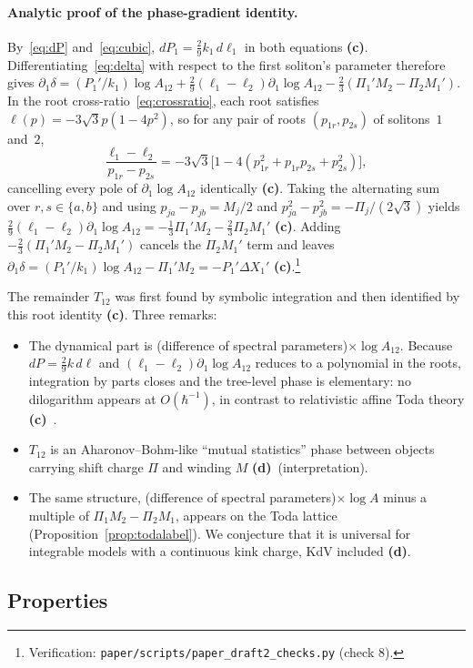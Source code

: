 \documentclass[11pt,a4paper]{article}
\newcommand{\lab}[1]{{\normalfont\sffamily\footnotesize\bfseries(#1)}}
\newcommand{\Lc}{\lab{c}}
\newcommand{\Ld}{\lab{d}}
\newcommand{\scr}[1]{\nolinkurl{#1}}
\newcommand{\chk}[1]{\footnote{\raggedright Verification: #1.}}
\newcommand{\hb}{\hbar}
\theoremstyle{remark}
\begin{document}
\paragraph{Analytic proof of the phase-gradient identity.} By~\eqref{eq:dP} and~\eqref{eq:cubic}, $dP_1=\tfrac29k_1\,d\ell_1$ in both equations \Lc. Differentiating~\eqref{eq:delta} with respect to the first soliton's parameter therefore gives $\partial_1\delta=(P_1'/k_1)\log A_{12}+\tfrac29(\ell_1-\ell_2)\partial_1\log A_{12}-\tfrac23(\Pi_1'M_2-\Pi_2M_1')$. In the root cross-ratio~\eqref{eq:crossratio}, each root satisfies $\ell(p)=-3\sqrt3p(1-4p^2)$, so for any pair of roots $(p_{1r},p_{2s})$ of solitons~$1$ and~$2$,
\[
\frac{\ell_1-\ell_2}{p_{1r}-p_{2s}}=-3\sqrt3\big[1-4(p_{1r}^2+p_{1r}p_{2s}+p_{2s}^2)\big],
\]
cancelling every pole of $\partial_1\log A_{12}$ identically \Lc. Taking the alternating sum over $r,s\in\{a,b\}$ and using $p_{ja}-p_{jb}=M_j/2$ and $p_{ja}^2-p_{jb}^2=-\Pi_j/(2\sqrt3)$ yields $\tfrac29(\ell_1-\ell_2)\partial_1\log A_{12}=-\tfrac13\Pi_1'M_2-\tfrac23\Pi_2M_1'$ \Lc. Adding $-\tfrac23(\Pi_1'M_2-\Pi_2M_1')$ cancels the $\Pi_2M_1'$ term and leaves $\partial_1\delta=(P_1'/k_1)\log A_{12}-\Pi_1'M_2=-P_1'\Delta X_1'$ \Lc.\chk{\scr{paper/scripts/paper_draft2_checks.py} (check 8)}

The remainder $T_{12}$ was first found by symbolic integration and then identified by this root identity \Lc. Three remarks:
\begin{itemize}
\item The dynamical part is (difference of spectral parameters)$\times\log A_{12}$. Because $dP=\tfrac29k\,d\ell$ and $(\ell_1-\ell_2)\partial_1\log A_{12}$ reduces to a polynomial in the roots, integration by parts closes and the tree-level phase is elementary: no dilogarithm appears at $O(\hb^{-1})$, in contrast to relativistic affine Toda theory \Lc~\cite{Hol93,Johnson}.
\item $T_{12}$ is an Aharonov--Bohm-like ``mutual statistics'' phase between objects carrying shift charge $\Pi$ and winding $M$ \Ld\ (interpretation).
\item The same structure, (difference of spectral parameters)$\times\log A$ minus a multiple of $\Pi_1M_2-\Pi_2M_1$, appears on the Toda lattice (Proposition~\ref{prop:todalabel}). We conjecture that it is universal for integrable models with a continuous kink charge, KdV included \Ld.
\end{itemize}

\subsection{Properties}
\end{document}
